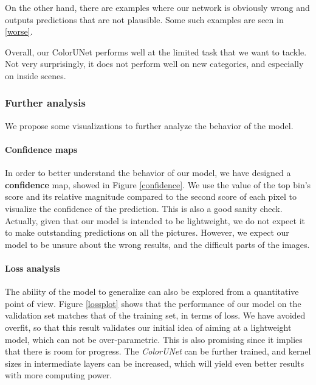 \documentclass[10pt,twocolumn,letterpaper]{article}
\begin{document}
On the other hand, there are examples where our network is obviously wrong and outputs predictions that are not plausible. Some such examples are seen in \ref{worse}.

Overall, our ColorUNet performs well at the limited task that we want to tackle. Not very surprisingly, it does not perform well on new categories, and especially on inside scenes.

\subsubsection{Further analysis}

We propose some visualizations to further analyze the behavior of the model.  

\paragraph{Confidence maps}


In order to better understand the behavior of our model, we have designed a \textbf{confidence} map, showed in Figure \ref{confidence}. We use the value of the top bin's score and its relative magnitude compared to the second score of each pixel to visualize the confidence of the prediction. This is also a good sanity check. Actually, given that our model is intended to be lightweight, we do not expect it to make outstanding predictions on all the pictures. However, we expect our model to be unsure about the wrong results, and the difficult parts of the images.




\paragraph{Loss analysis}


The ability of the model to generalize can also be explored from a quantitative point of view. Figure \ref{lossplot} shows that the performance of our model on the validation set matches that of the training set, in terms of loss. We have avoided overfit, so that this result validates our initial idea of aiming at a lightweight model, which can not be over-parametric. This is also promising since it implies that there is room for progress. The \textit{ColorUNet} can be further trained, and kernel sizes in intermediate layers can be increased, which will yield even better results with more computing power.
\end{document}
